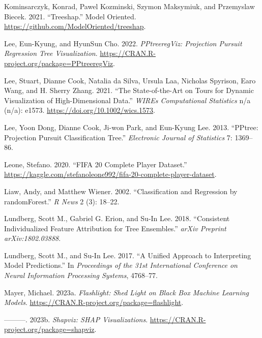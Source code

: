\documentclass[
]{article}
\newlength{\cslhangindent}
\newlength{\cslentryspacingunit} %
\newenvironment{CSLReferences}[2] %
 {%
  \setlength{\parindent}{0pt}
  \ifodd #1
  \let\oldpar\par
  \def\par{\hangindent=\cslhangindent\oldpar}
  \fi
  \setlength{\parskip}{#2\cslentryspacingunit}
 }%
 {}
\begin{document}
\begin{CSLReferences}{1}{0}
\leavevmode{}%
Kominsarczyk, Konrad, Pawel Kozminski, Szymon Maksymiuk, and Przemyslaw Biecek. 2021. {``Treeshap.''} Model Oriented. \url{https://github.com/ModelOriented/treeshap}.

\leavevmode{}%
Lee, Eun-Kyung, and HyunSun Cho. 2022. \emph{PPtreeregViz: Projection Pursuit Regression Tree Visualization}. \url{https://CRAN.R-project.org/package=PPtreeregViz}.

\leavevmode{}%
Lee, Stuart, Dianne Cook, Natalia da Silva, Ursula Laa, Nicholas Spyrison, Earo Wang, and H. Sherry Zhang. 2021. {``The State-of-the-Art on Tours for Dynamic Visualization of High-Dimensional Data.''} \emph{WIREs Computational Statistics} n/a (n/a): e1573. \url{https://doi.org/10.1002/wics.1573}.

\leavevmode{}%
Lee, Yoon Dong, Dianne Cook, Ji-won Park, and Eun-Kyung Lee. 2013. {``{PPtree}: {Projection} Pursuit Classification Tree.''} \emph{Electronic Journal of Statistics} 7: 1369--86.

\leavevmode{}%
Leone, Stefano. 2020. {``{FIFA} 20 Complete Player Dataset.''} \url{https://kaggle.com/stefanoleone992/fifa-20-complete-player-dataset}.

\leavevmode{}%
Liaw, Andy, and Matthew Wiener. 2002. {``Classification and Regression by {randomForest}.''} \emph{R News} 2 (3): 18--22.

\leavevmode{}%
Lundberg, Scott M., Gabriel G. Erion, and Su-In Lee. 2018. {``Consistent Individualized Feature Attribution for Tree Ensembles.''} \emph{arXiv Preprint arXiv:1802.03888}.

\leavevmode{}%
Lundberg, Scott M., and Su-In Lee. 2017. {``A Unified Approach to Interpreting Model Predictions.''} In \emph{Proceedings of the 31st International Conference on Neural Information Processing Systems}, 4768--77.

\leavevmode{}%
Mayer, Michael. 2023a. \emph{Flashlight: Shed Light on Black Box Machine Learning Models}. \url{https://CRAN.R-project.org/package=flashlight}.

\leavevmode{}%
---------. 2023b. \emph{Shapviz: SHAP Visualizations}. \url{https://CRAN.R-project.org/package=shapviz}.


\end{CSLReferences}
\end{document}

